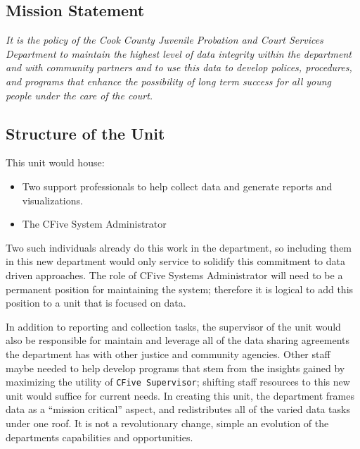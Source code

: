 \documentclass[12pt,]{article}
\providecommand{\tightlist}{%
  \setlength{\itemsep}{0pt}\setlength{\parskip}{0pt}}
\begin{document}
\hypertarget{mission-statement}{%
\subsection{Mission Statement}\label{mission-statement}}

\emph{It is the policy of the Cook County Juvenile Probation and Court
Services Department to maintain the highest level of data integrity
within the department and with community partners and to use this data
to develop polices, procedures, and programs that enhance the
possibility of long term success for all young people under the care of
the court.}

\hypertarget{structure-of-the-unit}{%
\subsection{Structure of the Unit}\label{structure-of-the-unit}}

This unit would house:

\begin{itemize}
\tightlist
\item
  Two support professionals to help collect data and generate reports
  and visualizations.
\item
  The CFive System Administrator
\end{itemize}

Two such individuals already do this work in the department, so
including them in this new department would only service to solidify
this commitment to data driven approaches. The role of CFive Systems
Administrator will need to be a permanent position for maintaining the
system; therefore it is logical to add this position to a unit that is
focused on data.

In addition to reporting and collection tasks, the supervisor of the
unit would also be responsible for maintain and leverage all of the data
sharing agreements the department has with other justice and community
agencies. Other staff maybe needed to help develop programs that stem
from the insights gained by maximizing the utility of
\texttt{CFive\ Supervisor}; shifting staff resources to this new unit
would suffice for current needs. In creating this unit, the department
frames data as a ``mission critical'' aspect, and redistributes all of
the varied data tasks under one roof. It is not a revolutionary change,
simple an evolution of the departments capabilities and opportunities.
\end{document}
